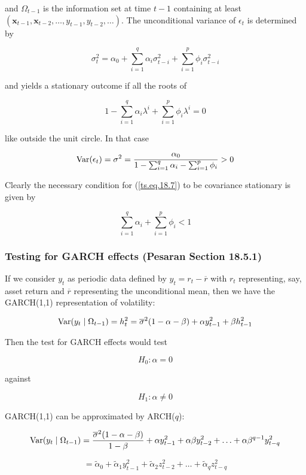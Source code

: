 and \(\Omega_{t-1}\) is the information set at time \(t - 1\) containing at least \((\boldsymbol{x}_{t-1}, \boldsymbol{x}_{t-2}, \ldots, y_{t-1}, y_{t-2}, \ldots)\). The unconditional variance of \(\epsilon_t\) is determined by 

\[
\sigma_t^2 = \alpha_0 + \sum_{i=1}^q \alpha_i \sigma_{t-i}^2 + \sum_{i=1}^p \phi_i \sigma_{t-i}^2
\]

and yields a stationary outcome if all the roots of

\[
1 - \sum_{i=1}^q \alpha_i \lambda^i + \sum_{i=1}^p \phi_i \lambda^i = 0
\]

like outside the unit circle. In that case

\begin{equation} \label{ts.eq.18.8}
\Var(\epsilon_t) = \sigma^2 = \frac{\alpha_0}{1 - \sum_{i=1}^q \alpha_i - \sum_{i=1}^p \phi_i } > 0
\end{equation}

Clearly the necessary condition for (\ref{ts.eq.18.7}) to be covariance stationary is given by

\[
\sum_{i=1}^q \alpha_i + \sum_{i=1}^p \phi_i < 1
\]

\subsubsection{Testing for GARCH effects (Pesaran Section 18.5.1)} \label{ts.pesaran.18.5.1}

If we consider \(y_t\) as periodic data defined by \(y_t = r_t - \overline{r}\) with \(r_t\) representing, say, asset return and \(\overline{r}\) representing the unconditional mean, then we have the GARCH(1,1) representation of volatility:

\[
\Var(y_t \mid \Omega_{t-1}) = h_t^2 =  \overline{\sigma}^2(1 - \alpha - \beta) + \alpha y_{t-1}^2 + \beta h_{t-1}^2
\]

Then the test for GARCH effects would test

\[
H_0:  \alpha = 0
\]

against 

\[
H_1: \alpha \neq 0 
\]

GARCH(1,1) can be approximated by ARCH(\(q\)):

\[
\Var(y_t \mid \Omega_{t-1}) = \frac{\overline{\sigma}^2(1 - \alpha - \beta)}{1 - \beta} + \alpha y_{t-1}^2 + \alpha \beta y_{t-2}^2 + \ldots + \alpha \beta^{q-1} y_{t-q}^2
\]

\[
= \tilde{\alpha}_0 + \tilde{\alpha}_1 y_{t-1}^2 + \tilde{\alpha}_2 z_{t-2}^2 + \ldots + \tilde{\alpha}_q z_{t-q}^2
\]

